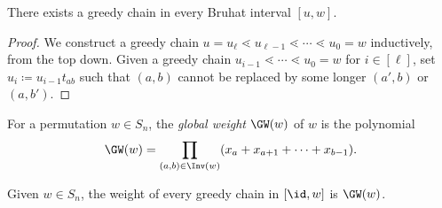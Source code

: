 \begin{lemma}\label{lem:existsgreedychain}
    There exists a greedy chain in every Bruhat interval $[u, w]$. 
\end{lemma}

\begin{proof}
    We construct a greedy chain $u = u_{\ell} \lessdot u_{\ell-1} \lessdot\cdots\lessdot u_{0} = w$ inductively, from the top down. Given a greedy chain $ u_{i-1} \lessdot \cdots\lessdot u_{0} = w$ for $i\in [\ell]$, set $u_{i}\coloneq u_{i-1}t_{ab}$ such that $(a, b)$ cannot be replaced by some longer $(a', b)$ or $(a, b')$. 
\end{proof}

\begin{defi}\label{def:globalweight}
    For a permutation $w\in S_n$, the \emph{global weight} $\GW(w)$ of $w$ is the polynomial
    \[\GW(w) = \prod_{(a,b) \in \Inv(w)} (x_a+x_{a+1}+\dots +x_{b-1}).\]
\end{defi}


\begin{lemma}\label{lemma:greedy=GW}
    Given $w\in S_n$, the weight of every greedy chain in $[\id,w]$ is $\GW(w)$.
\end{lemma}

